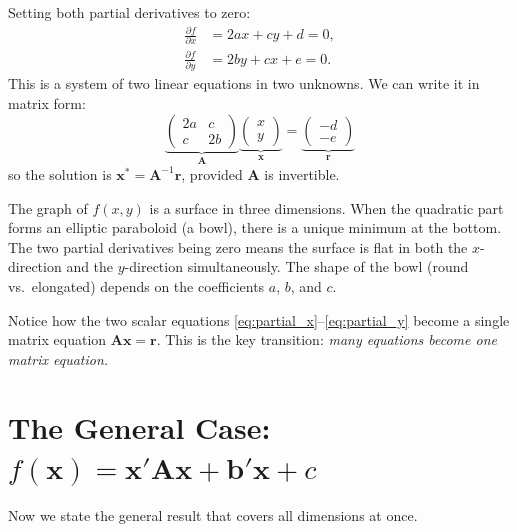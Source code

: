 \documentclass[11pt,a4paper]{article}
\begin{document}
\begin{formaldef}
Setting both partial derivatives to zero:
\begin{align}
\frac{\partial f}{\partial x} &= 2ax + cy + d = 0, \label{eq:partial_x}\\[4pt]
\frac{\partial f}{\partial y} &= 2by + cx + e = 0. \label{eq:partial_y}
\end{align}
This is a system of two linear equations in two unknowns. We can write it in matrix form:
\[
\underbrace{\begin{pmatrix} 2a & c \\ c & 2b \end{pmatrix}}_{\bm{A}}
\underbrace{\begin{pmatrix} x \\ y \end{pmatrix}}_{\bm{x}}
=
\underbrace{\begin{pmatrix} -d \\ -e \end{pmatrix}}_{\bm{r}}
\]
so the solution is $\bm{x}^* = \bm{A}^{-1}\bm{r}$, provided $\bm{A}$ is invertible.
\end{formaldef}

\begin{intuition}[A Bowl in 3D]
The graph of $f(x,y)$ is a surface in three dimensions. When the quadratic part forms an elliptic paraboloid (a bowl), there is a unique minimum at the bottom. The two partial derivatives being zero means the surface is flat in both the $x$-direction and the $y$-direction simultaneously. The shape of the bowl (round vs.\ elongated) depends on the coefficients $a$, $b$, and $c$.
\end{intuition}

Notice how the two scalar equations \eqref{eq:partial_x}--\eqref{eq:partial_y} become a single matrix equation $\bm{A}\bm{x} = \bm{r}$. This is the key transition: \emph{many equations become one matrix equation.}

\section{The General Case: \texorpdfstring{$f(\bm{x}) = \bm{x}'\bm{A}\bm{x} + \bm{b}'\bm{x} + c$}{f(x) = x'Ax + b'x + c}}

Now we state the general result that covers all dimensions at once.
\end{document}
